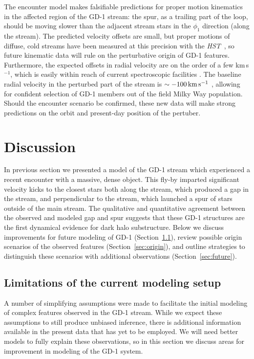\documentclass[twocolumn]{aastex62}
\newcommand{\hst}{\textsl{HST}}
\begin{document}
The encounter model makes falsifiable predictions for proper motion kinematics in the affected region of the GD-1 stream: the spur, as a trailing part of the loop, should be moving slower than the adjacent stream stars in the $\phi_1$ direction (along the stream).
The predicted velocity offsets are small, but proper motions of diffuse, cold streams have been measured at this precision with the \hst\ \citep{sohn2016}, so future kinematic data will rule on the perturbative origin of GD-1 features.
Furthermore, the expected offsets in radial velocity are on the order of a few km\,s$^{-1}$, which is easily within reach of current spectroscopic facilities \citep[e.g.,][]{sg2007}.
The baseline radial velocity in the perturbed part of the stream is $\sim-100\,\rm km\,s^{-1}$ \citep{koposov2010}, allowing for confident selection of GD-1 members out of the field Milky Way population.
Should the encounter scenario be confirmed, these new data will make strong predictions on the orbit and present-day position of the pertuber.


\section{Discussion}
\label{sec:discussion}
In previous section we presented a model of the GD-1 stream which experienced a recent encounter with a massive, dense object.
This fly-by imparted significant velocity kicks to the closest stars both along the stream, which produced a gap in the stream, and perpendicular to the stream, which launched a spur of stars outside of the main stream.
The qualitative and quantitative agreement between the observed and modeled gap and spur suggests that these GD-1 structures are the first dynamical evidence for dark halo substructure.
Below we discuss improvements for future modeling of GD-1 (Section~\ref{sec:caveats}), review possible origin scenarios of the observed features (Section~\ref{sec:origin}), and outline strategies to distinguish these scenarios with additional observations (Section~\ref{sec:future}).

\subsection{Limitations of the current modeling setup}
\label{sec:caveats}
A number of simplifying assumptions were made to facilitate the initial modeling of complex features observed in the GD-1 stream.
While we expect these assumptions to still produce unbiased inference, there is additional information available in the present data that has yet to be employed.
We will need better models to fully explain these observations, so in this section we discuss areas for improvement in modeling of the GD-1 system.
\end{document}

